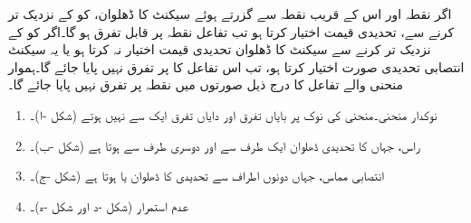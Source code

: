 اگر نقطہ  اور اس کے قریب نقطہ  سے گزرتے ہوئے سیکنٹ کا ڈھلوان،  کو  کے نزدیک تر کرنے سے، تحدیدی قیمت اختیار کرتا ہو  تب تفاعل  نقطہ  پر قابل تفرق ہو گا۔اگر  کو  کے نزدیک تر کرنے سے سیکنٹ کا ڈھلوان  تحدیدی قیمت اختیار نہ کرتا  ہو یا یہ سیکنٹ انتصابی تحدیدی صورت اختیار کرتا  ہو، تب اس تفاعل کا  پر تفرق نہیں پایا جائے گا۔ہموار منحنی والے تفاعل کا درج ذیل صورتوں میں نقطہ  پر تفرق نہیں پایا جائے گا۔
\begin{enumerate}[1.]

\item
نوکدار منحنی۔منحنی کی نوک  پر بایاں  تفرق اور دایاں تفرق ایک  سے نہیں ہوتے (شکل -ا)۔
\item
راس، جہاں  کا تحدیدی ڈھلوان ایک طرف سے  اور دوسری   طرف سے  ہوتا  ہے (شکل -ب)۔ 
\item
انتصابی مماس، جہاں دونوں اطراف سے تحدیدی  کا  ڈھلوان  یا  ہوتا ہے (شکل -ج)۔
\item
عدم استمرار (شکل -د اور شکل -ہ)۔
\end{enumerate}

